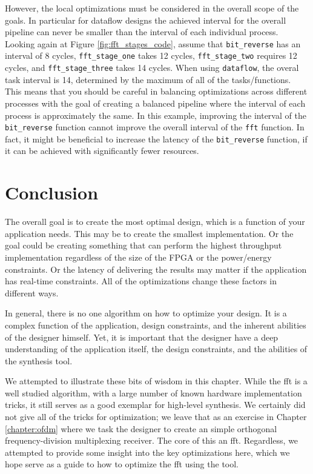 However, the local optimizations must be considered in the overall scope of the goals. In particular for dataflow designs the achieved interval for the overall pipeline can never be smaller than the interval of each individual process. Looking again at Figure \ref{fig:fft_stages_code}, assume that \lstinline{bit_reverse} has an interval of 8 cycles, \lstinline{fft_stage_one} takes 12 cycles, \lstinline{fft_stage_two} requires 12 cycles, and \lstinline{fft_stage_three} takes 14 cycles. When using \lstinline{dataflow}, the overal task interval is 14, determined by the maximum of all of the tasks/functions. This means that you should be careful in balancing optimizations across different processes with the goal of creating a balanced pipeline where the interval of each process is approximately the same. In this example, improving the interval of the \lstinline{bit_reverse} function cannot improve the overall interval of the \lstinline|fft| function. In fact, it might be beneficial to increase the latency of the \lstinline{bit_reverse} function, if it can be achieved with significantly fewer resources.

\section{Conclusion}
\label{sec:fft_conclusion}

The overall goal is to create the most optimal design, which is a function of your application needs. This may be to create the smallest implementation. Or the goal could be creating something that can perform the highest throughput implementation regardless of the size of the FPGA or the power/energy constraints. Or the latency of delivering the results may matter if the application has real-time constraints. All of the optimizations change these factors in different ways. 

In general, there is no one algorithm on how to optimize your design. It is a complex function of the application, design constraints, and the inherent abilities of the designer himself. Yet, it is important that the designer have a deep understanding of the application itself, the design constraints, and the abilities of the synthesis tool. 

We attempted to illustrate these bits of wisdom in this chapter. While the \gls{fft} is a well studied algorithm, with a large number of known hardware implementation tricks, it still serves as a good exemplar for high-level synthesis. We certainly did not give all of the tricks for optimization; we leave that as an exercise in Chapter \ref{chapter:ofdm} where we task the designer to create an simple orthogonal frequency-division multiplexing receiver. The core of this an \gls{fft}.  Regardless, we attempted to provide some insight into the key optimizations here, which we hope serve as a guide to how to optimize the \gls{fft} using the \VHLS tool.

